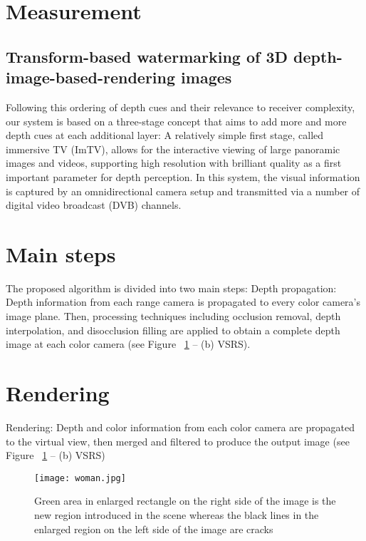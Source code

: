 \documentclass[fleqn,10pt]{a}
\begin{document}
\tableofcontents
\clearpage
\section{Measurement}\label{sec:this}
\subsection{Transform-based watermarking of 3D depth-image-based-rendering images}

Following this ordering of depth cues and their relevance to receiver complexity, our system is based on a three-stage concept that aims to add more and more depth cues at each additional layer:
A relatively simple first stage, called immersive TV (ImTV), allows for the interactive viewing of large panoramic images and videos, supporting high resolution with brilliant quality as a first important parameter for depth perception. In this system, the visual information is captured by an omnidirectional camera setup and transmitted via a number of digital video broadcast (DVB) channels.

\section{Main steps}

The proposed algorithm is divided into two main steps: 
Depth propagation: Depth information from each range camera is propagated to every color camera’s image plane. Then, processing techniques including occlusion removal, depth interpolation, and disocclusion filling are applied to obtain a complete depth image at each color camera (see Figure ~\ref{fig:view} – (b) VSRS).

\section{Rendering}

Rendering: Depth and color information from each color camera are propagated to the virtual view, then merged and filtered to produce the output image (see Figure ~\ref{fig:view} – (b) VSRS)

\begin{figure}[ht]
\centering
\texttt{[image: woman.jpg]}
\caption{Green area in enlarged rectangle on the right side of the image is the new region introduced in the scene whereas the black lines in the enlarged region on the left side of the image are cracks}
\label{fig:view}
\end{figure}
\end{document}
